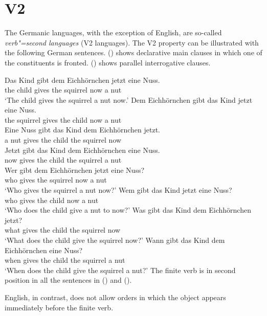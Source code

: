 \section{V2}
\label{sec-phenomenon-v2}

The Germanic languages, with the exception of English, are so-called \emph{verb"=second languages} (V2
languages). The V2
property can be illustrated with the following German sentences. () shows declarative main
clauses in which one of the constituents is fronted. () shows parallel interrogative clauses.

\eal
\ex 
\gll Das Kind  gibt dem Eichhörnchen jetzt eine Nuss.\\
     the child gives the squirrel now a nut\\
\glt `The child gives the squirrel a nut now.'
\ex 
\gll Dem Eichhörnchen gibt das Kind jetzt eine Nuss.\\
     the squirrel gives the child now a nut\\
\ex 
\gll Eine Nuss gibt das Kind dem Eichhörnchen jetzt.\\
     a nut gives the child the squirrel now\\
\ex 
\gll Jetzt gibt das Kind dem Eichhörnchen eine Nuss.\\
     now gives the child the squirrel a nut\\
\zl
\eal
\ex 
\gll Wer gibt dem Eichhörnchen jetzt eine Nuss?\\  
     who gives the squirrel now a nut\\
\glt `Who gives the squirrel a nut now?'
\ex 
\gll Wem gibt das Kind jetzt eine Nuss?\\
     who gives the child now a nut\\
\glt `Who does the child give a nut to now?'
\ex 
\gll Was gibt das Kind dem Eichhörnchen jetzt?\\
     what gives the child the squirrel now\\
\glt `What does the child give the squirrel now?'
\ex 
\gll Wann gibt das Kind dem Eichhörnchen eine Nuss?\\
     when gives the child the squirrel a nut\\
\glt `When does the child give the squirrel a nut?'
\zl
The finite verb is in second position in all the sentences in () and ().


English, in contrast, does not allow orders in which the object appears immediately before the
finite verb.

